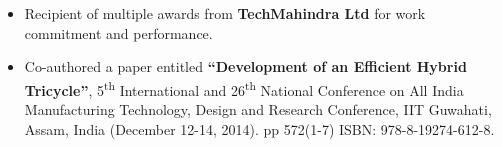 %
%
%

\twocolumnsection
{
\vspace{2em}
\begin{itemize}
	\item Recipient of multiple awards from \textbf{TechMahindra Ltd} for work commitment and performance.\\
	\item Co-authored a paper entitled \textbf{“Development of an Efficient Hybrid Tricycle”}, 5\textsuperscript{th} International and 26\textsuperscript{th} National Conference on All India Manufacturing Technology, Design and Research Conference, IIT Guwahati, Assam, India (December 12-14, 2014). pp 572(1-7) ISBN: 978-8-19274-612-8.
\end{itemize}}
{
\vspace{1em}
\begin{skills}
\end{skills}
}
